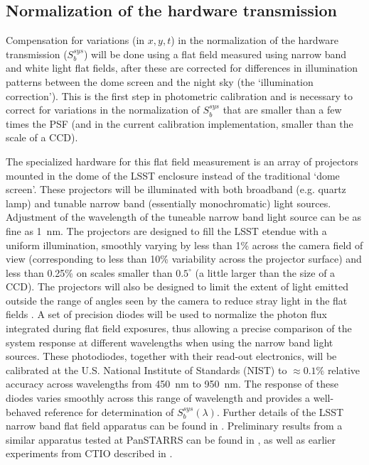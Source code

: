 \documentclass[12pt,preprint]{aastex}
\begin{document}
\subsection{Normalization of the hardware transmission}
\label{sec:narrowband}

Compensation for variations (in $x,y,t$) in the normalization of the
hardware transmission ($S_b^{sys}$) will be done using a flat field measured
using narrow band and white light flat fields, after these are
corrected for differences in illumination patterns between the dome
screen and the night sky (the `illumination correction'). This is the
first step in photometric calibration and is necessary to correct for
variations in the normalization of $S_b^{sys}$ that are smaller than a
few times the PSF (and in the current calibration implementation,
smaller than the scale of a CCD).

The specialized hardware for this flat field measurement is an array
of projectors mounted in the dome of the LSST enclosure instead of the
traditional `dome screen'. These projectors will be illuminated with
both broadband (e.g. quartz lamp) and tunable narrow band (essentially
monochromatic) light sources.  Adjustment of the wavelength of the
tuneable narrow band light source can be as fine as 1~nm. The
projectors are designed to fill the LSST etendue with a uniform
illumination, smoothly varying by less than 1\% across the camera
field of view (corresponding to less than 10\% variability across the
projector surface) and less than 0.25\% on scales smaller than
$0.5^{\circ}$ (a little larger than the size of a CCD).  The
projectors will also be designed to limit the extent of light emitted
outside the range of angles seen by the camera to reduce stray light
in the flat fields \citep{Gressler2010}. A set of precision diodes
will be used to normalize the photon flux integrated during flat field
exposures, thus allowing a precise comparison of the system response
at different wavelengths when using the narrow band light sources.
These photodiodes, together with their read-out electronics, will be
calibrated at the U.S. National Institute of Standards (NIST) to
$\approx0.1\%$ relative accuracy across wavelengths from 450~nm to
950~nm. The response of these diodes varies smoothly across this range
of wavelength and provides a well-behaved reference for determination
of $S_b^{sys}(\lambda)$.  Further details of the LSST narrow band flat
field apparatus can be found in \citet{Gressler2010}.  Preliminary
results from a similar apparatus tested at PanSTARRS can be found in
\citet{Stubbs2010a}, as well as earlier experiments from CTIO described
in \citet{Stubbs2007a}.
\end{document}
